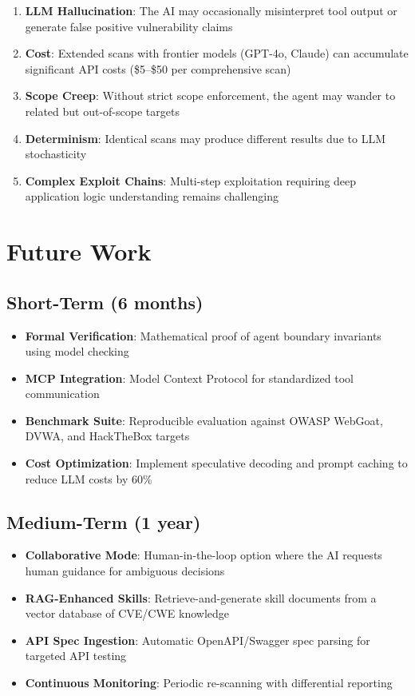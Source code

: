 \documentclass[12pt,a4paper]{article}
\begin{document}
\begin{enumerate}
    \item \textbf{LLM Hallucination}: The AI may occasionally misinterpret
          tool output or generate false positive vulnerability claims
    \item \textbf{Cost}: Extended scans with frontier models (GPT-4o, Claude)
          can accumulate significant API costs (\$5--\$50 per comprehensive scan)
    \item \textbf{Scope Creep}: Without strict scope enforcement, the agent
          may wander to related but out-of-scope targets
    \item \textbf{Determinism}: Identical scans may produce different results
          due to LLM stochasticity
    \item \textbf{Complex Exploit Chains}: Multi-step exploitation requiring
          deep application logic understanding remains challenging
\end{enumerate}

\section{Future Work}

\subsection{Short-Term (6 months)}
\begin{itemize}[nosep]
    \item \textbf{Formal Verification}: Mathematical proof of agent boundary
          invariants using model checking
    \item \textbf{MCP Integration}: Model Context Protocol for standardized
          tool communication
    \item \textbf{Benchmark Suite}: Reproducible evaluation against OWASP
          WebGoat, DVWA, and HackTheBox targets
    \item \textbf{Cost Optimization}: Implement speculative decoding and
          prompt caching to reduce LLM costs by 60\%
\end{itemize}

\subsection{Medium-Term (1 year)}
\begin{itemize}[nosep]
    \item \textbf{Collaborative Mode}: Human-in-the-loop option where the
          AI requests human guidance for ambiguous decisions
    \item \textbf{RAG-Enhanced Skills}: Retrieve-and-generate skill
          documents from a vector database of CVE/CWE knowledge
    \item \textbf{API Spec Ingestion}: Automatic OpenAPI/Swagger spec
          parsing for targeted API testing
    \item \textbf{Continuous Monitoring}: Periodic re-scanning with
          differential reporting
\end{itemize}
\end{document}
